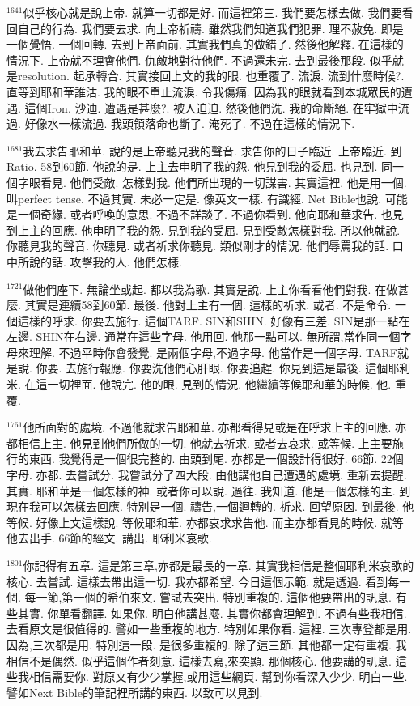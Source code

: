 \documentclass{book}
\begin{document}
$^{1641}$似乎核心就是說上帝.
就算一切都是好.
而這裡第三.
我們要怎樣去做.
我們要看回自己的行為.
我們要去求.
向上帝祈禱.
雖然我們知道我們犯罪.
理不赦免.
即是一個覺悟.
一個回轉.
去到上帝面前.
其實我們真的做錯了.
然後他解釋.
在這樣的情況下.
上帝就不理會他們.
仇敵地對待他們.
不過還未完.
去到最後那段.
似乎就是resolution.
起承轉合.
其實接回上文的我的眼.
也重覆了.
流淚.
流到什麼時候?.
直等到耶和華誰沽.
我的眼不單止流淚.
令我傷痛.
因為我的眼就看到本城眾民的遭遇.
這個Iron.
沙迪.
遭遇是甚麼?.
被人迫迫.
然後他們洗.
我的命斷絕.
在牢獄中流過.
好像水一樣流過.
我頭領落命也斷了.
淹死了.
不過在這樣的情況下.

$^{1681}$我去求告耶和華.
說的是上帝聽見我的聲音.
求告你的日子臨近.
上帝臨近.
到Ratio.
58到60節.
他說的是.
上主去申明了我的怨.
他見到我的委屈.
也見到.
同一個字眼看見.
他們受敵.
怎樣對我.
他們所出現的一切謀害.
其實這裡.
他是用一個.
叫perfect tense.
不過其實.
未必一定是.
像英文一樣.
有識經.
Net Bible也說.
可能是一個奇緣.
或者呼喚的意思.
不過不詳談了.
不過你看到.
他向耶和華求告.
也見到上主的回應.
他申明了我的怨.
見到我的受屈.
見到受敵怎樣對我.
所以他就說.
你聽見我的聲音.
你聽見.
或者祈求你聽見.
類似剛才的情況.
他們辱罵我的話.
口中所說的話.
攻擊我的人.
他們怎樣.

$^{1721}$做他們座下.
無論坐或起.
都以我為歌.
其實是說.
上主你看看他們對我.
在做甚麼.
其實是連續58到60節.
最後.
他對上主有一個.
這樣的祈求.
或者.
不是命令.
一個這樣的呼求.
你要去施行.
這個TARF.
SIN和SHIN.
好像有三差.
SIN是那一點在左邊.
SHIN在右邊.
通常在這些字母.
他用回.
他那一點可以.
無所謂,當作同一個字母來理解.
不過平時你會發覺.
是兩個字母,不過字母.
他當作是一個字母.
TARF就是說.
你要.
去施行報應.
你要洗他們心肝眼.
你要追趕.
你見到這是最後.
這個耶利米.
在這一切裡面.
他說完.
他的眼.
見到的情況.
他繼續等候耶和華的時候.
他.
重覆.

$^{1761}$他所面對的處境.
不過他就求告耶和華.
亦都看得見或是在呼求上主的回應.
亦都相信上主.
他見到他們所做的一切.
他就去祈求.
或者去哀求.
或等候.
上主要施行的東西.
我覺得是一個很完整的.
由頭到尾.
亦都是一個設計得很好.
66節.
22個字母.
亦都.
去嘗試分.
我嘗試分了四大段.
由他講他自己遭遇的處境.
重新去提醒.
其實.
耶和華是一個怎樣的神.
或者你可以說.
過往.
我知道.
他是一個怎樣的主.
到現在我可以怎樣去回應.
特別是一個.
禱告,一個迴轉的.
祈求.
回望原因.
到最後.
他等候.
好像上文這樣說.
等候耶和華.
亦都哀求求告他.
而主亦都看見的時候.
就等他去出手.
66節的經文.
講出.
耶利米哀歌.

$^{1801}$你記得有五章.
這是第三章,亦都是最長的一章.
其實我相信是整個耶利米哀歌的核心.
去嘗試.
這樣去帶出這一切.
我亦都希望.
今日這個示範.
就是透過.
看到每一個.
每一節,第一個的希伯來文.
嘗試去突出.
特別重複的.
這個他要帶出的訊息.
有些其實.
你單看翻譯.
如果你.
明白他講甚麼.
其實你都會理解到.
不過有些我相信.
去看原文是很值得的.
譬如一些重複的地方.
特別如果你看.
這裡.
三次專登都是用.
因為,三次都是用.
特別這一段.
是很多重複的.
除了這三節.
其他都一定有重複.
我相信不是偶然.
似乎這個作者刻意.
這樣去寫,來突顯.
那個核心.
他要講的訊息.
這些我相信需要你.
對原文有少少掌握,或用這些網頁.
幫到你看深入少少.
明白一些.
譬如Next Bible的筆記裡所講的東西.
以致可以見到.
\end{document}
